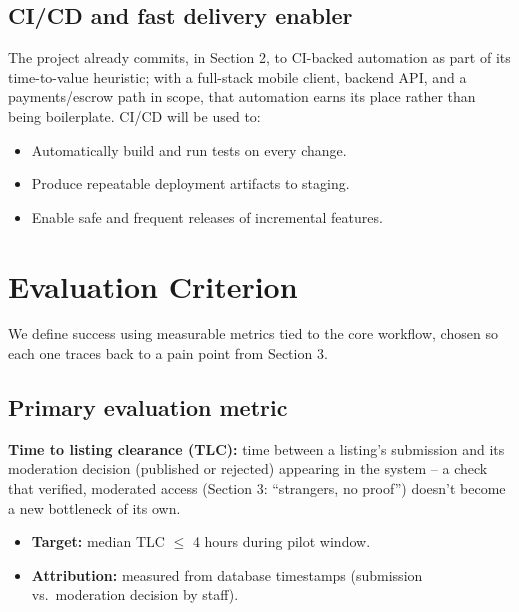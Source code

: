 \documentclass[11pt]{article}
\begin{document}
\subsection{CI/CD and fast delivery enabler}
The project already commits, in Section 2, to CI-backed automation as part of its time-to-value heuristic; with a full-stack mobile client, backend API, and a payments/escrow path in scope, that automation earns its place rather than being boilerplate. CI/CD will be used to:
\begin{itemize}[leftmargin=*]
\item Automatically build and run tests on every change.
\item Produce repeatable deployment artifacts to staging.
\item Enable safe and frequent releases of incremental features.
\end{itemize}

\section{Evaluation Criterion}
We define success using measurable metrics tied to the core workflow, chosen so each one traces back to a pain point from Section 3.

\subsection{Primary evaluation metric}
\textbf{Time to listing clearance (TLC):} time between a listing's submission and its moderation decision (published or rejected) appearing in the system -- a check that verified, moderated access (Section 3: ``strangers, no proof'') doesn't become a new bottleneck of its own.
\begin{itemize}[leftmargin=*]
\item \textbf{Target:} median TLC $\leq$ 4 hours during pilot window.
\item \textbf{Attribution:} measured from database timestamps (submission vs.\ moderation decision by staff).
\end{itemize}
\end{document}
